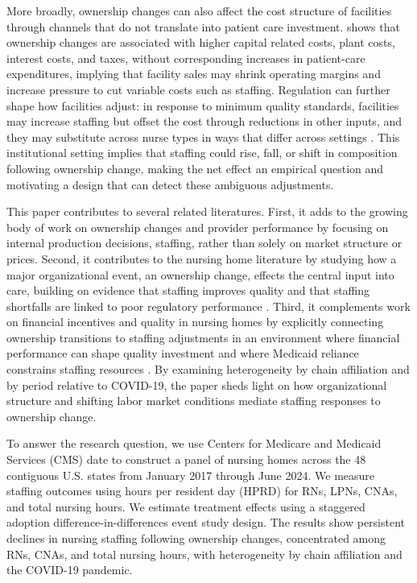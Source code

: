 \documentclass[12pt]{article}
\begin{document}
More broadly, ownership changes can also affect the cost structure of facilities through channels that do not translate into patient care investment. \cite{holmes_1996} shows that ownership changes are associated with higher capital related costs, plant costs, interest costs, and taxes, without corresponding increases in patient-care expenditures, implying that facility sales may shrink operating margins and increase pressure to cut variable costs such as staffing. Regulation can further shape how facilities adjust: in response to minimum quality standards, facilities may increase staffing but offset the cost through reductions in other inputs, and they may substitute across nurse types in ways that differ across settings \citep{bowblis_ghattas_2017}. This institutional setting implies that staffing could rise, fall, or shift in composition following ownership change, making the net effect an empirical question and motivating a design that can detect these ambiguous adjustments.

This paper contributes to several related literatures. First, it adds to the growing body of work on ownership changes and provider performance by focusing on internal production decisions, staffing, rather than solely on market structure or prices. Second, it contributes to the nursing home literature by studying how a major organizational event, an ownership change, effects the central input into care, building on evidence that staffing improves quality \citep{lin_2014} and that staffing shortfalls are linked to poor regulatory performance \citep{harrington_et_al_2000}. Third, it complements work on financial incentives and quality in nursing homes by explicitly connecting ownership transitions to staffing adjustments in an environment where financial performance can shape quality investment \citep{park_werner_2011} and where Medicaid reliance constrains staffing resources \citep{bowblis_brunt_2025}. By examining heterogeneity by chain affiliation and by period relative to COVID-19, the paper sheds light on how organizational structure and shifting labor market conditions mediate staffing responses to ownership change.

To answer the research question, we use Centers for Medicare and Medicaid Services (CMS) date to construct a panel of nursing homes across the 48 contiguous U.S. states from January 2017 through June 2024. We measure staffing outcomes using hours per resident day (HPRD) for RNs, LPNs, CNAs, and total nursing hours. We estimate treatment effects using a staggered adoption difference-in-differences event study design. The results show persistent declines in nursing staffing following ownership changes, concentrated among RNs, CNAs, and total nursing hours, with heterogeneity by chain affiliation and the COVID-19 pandemic.
\end{document}
